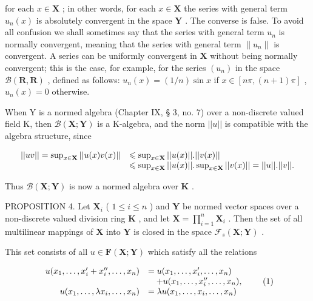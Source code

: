 for each \(x \in \mathbf{X}\) ; in other words, for each \(x \in \mathbf{X}\) the series with general term \(u_n(x)\) is absolutely convergent in the space \(\mathbf{Y}\) . The converse is false. To avoid all confusion we shall sometimes say that the series with general term \(u_n\) is normally convergent, meaning that the series with general term \(\| u_n \|\) is convergent. A series can be uniformly convergent in \(\mathbf{X}\) without being normally convergent; this is the case, for example, for the series \((u_n)\) in the space \(\mathcal{B}(\mathbf{R}, \mathbf{R})\) , defined as follows: \(u_n(x) = (1/n) \sin x\) if \(x \in [n\pi, (n + 1)\pi]\) , \(u_n(x) = 0\) otherwise.

When Y is a normed algebra (Chapter IX, § 3, no. 7) over a non-discrete valued field K, then \(\mathcal{B}(\mathbf{X};\mathbf{Y})\) is a K-algebra, and the norm \(||u||\) is compatible with the algebra structure, since

\[
\begin{array}{r l} | | u v | | = \sup _ {x \in \mathbf {X}} | | u (x) v (x) | | & \leqslant \sup _ {x \in \mathbf {X}} | | u (x) | |. | | v (x) | | \\ & \leqslant \sup _ {x \in \mathbf {X}} | | u (x) | |. \sup _ {x \in \mathbf {X}} | | v (x) | | = | | u | |. | | v | |. \end{array}
\]

Thus \(\mathcal{B}(\mathbf{X};\mathbf{Y})\) is now a normed algebra over \(\mathbf{K}\) .

PROPOSITION 4. Let \(\mathbf{X}_i\) ( \(1 \leqslant i \leqslant n\) ) and \(\mathbf{Y}\) be normed vector spaces over a non-discrete valued division ring \(\mathbf{K}\) , and let \(\mathbf{X} = \prod_{i=1}^{n} \mathbf{X}_i\) . Then the set of all multilinear mappings of \(\mathbf{X}\) into \(\mathbf{Y}\) is closed in the space \(\mathcal{F}_s(\mathbf{X}; \mathbf{Y})\) .

This set consists of all \(u \in \mathbf{F}(\mathbf{X};\mathbf{Y})\) which satisfy all the relations

\[
\begin{array}{r l} u (x _ {1}, \dots , x _ {i} ^ {\prime} + x _ {i} ^ {\prime \prime}, \dots , x _ {n}) & = u (x _ {1}, \dots , x _ {i} ^ {\prime}, \dots , x _ {n}) \\ & \quad + u (x _ {1}, \dots , x _ {i} ^ {\prime \prime}, \dots , x _ {n}), \\ u (x _ {1}, \dots , \lambda x _ {i}, \dots , x _ {n}) & = \lambda u (x _ {1}, \dots , x _ {i}, \dots , x _ {n}) \end{array}\tag{1}
\]


